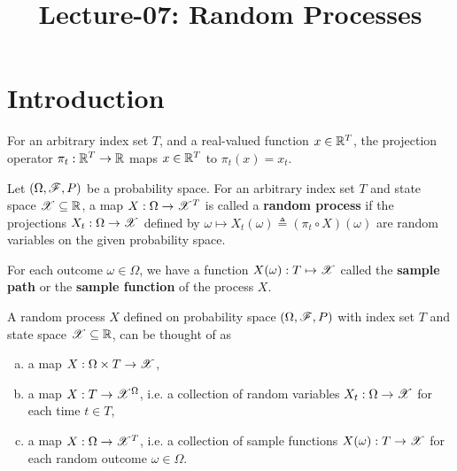 \documentclass[letterpaper,10pt,english]{article}
\title{Lecture-07: Random Processes}
\author{}
\begin{document}
\maketitle

\section{Introduction} 
\begin{rem}
For an arbitrary index set $T$, and a real-valued function $x \in \mathbb{R}^T$, 
the projection operator $\pi_t:\mathbb{R}^T\to\mathbb{R}$ maps $x\in\mathbb{R}^T$ to $\pi_t(x) = x_t$. 
\end{rem}
\begin{defn}
Let $(\Omega, \mathscr{F}, P)$ be a probability space. 
For an arbitrary index set $T$ and state space $\mathscr{X} \subseteq \mathbb{R}$, 
a map $X : \Omega \to \mathscr{X}^T$ is called a \textbf{random process} if the projections $X_t:\Omega\to\mathscr{X}$ defined by $\omega \mapsto X_t(\omega) \triangleq (\pi_t\circ X)(\omega)$ are random variables on the given probability space. 
\end{defn}
\begin{defn} 
For each outcome $\omega \in \Omega$, we have a function $X(\omega): T \mapsto \mathscr{X}$ called the \textbf{sample path} or the \textbf{sample function} of the process $X$. %
\end{defn}
\begin{rem} 
A random process $X$ defined on probability space $(\Omega, \mathscr{F}, P)$ with index set $T$ and state space $\mathscr{X}\subseteq\mathbb{R}$, can be thought of as 
\begin{enumerate}[(a)]
\item a map $X: \Omega \times T \to \mathscr{X}$, 
\item a map $X: T \to \mathscr{X}^\Omega$, i.e. a collection of random variables $X_t: \Omega \to \mathscr{X}$ for each time $t \in T$, 
\item a map $X: \Omega \to \mathscr{X}^T$, i.e. a collection of sample functions $X(\omega): T \to \mathscr{X}$ for each random outcome $\omega \in \Omega$. 
\end{enumerate}
\end{rem}
\end{document}
